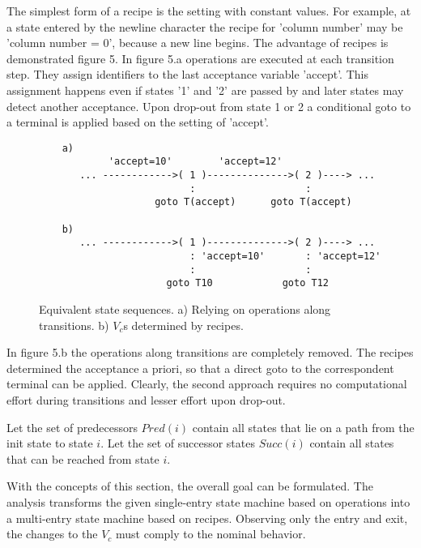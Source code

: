 \documentclass[12pt,a4paper]{scrartcl}
\theoremstyle{break}
\begin{document}
The simplest form of a recipe is the setting with constant values.  For
example, at a state entered by the newline character the recipe for 'column
number' may be 'column number = 0', because a new line begins. The advantage of
recipes is demonstrated figure 5.  In figure 5.a operations are executed at
each transition step. They assign identifiers to the last acceptance variable
'accept'. This assignment happens even if states '1' and '2' are passed by and
later states may detect another acceptance. Upon drop-out from state 1 or 2 a
conditional goto to a terminal is applied based on the setting of 'accept'. 

\begin{figure}[htbp] \leavevmode
\begin{verbatim}
    a)        
            'accept=10'        'accept=12'        
       ... ------------>( 1 )-------------->( 2 )----> ...
                          :                   :
                    goto T(accept)      goto T(accept)

    b) 
       ... ------------>( 1 )-------------->( 2 )----> ...
                          : 'accept=10'       : 'accept=12'              
                          :                   :
                      goto T10            goto T12

\end{verbatim}
\caption{Equivalent state sequences. a) Relying on operations along
transitions. b) $V_c$s determined by recipes.}
\end{figure}


In figure 5.b the operations along transitions are completely removed. The
recipes determined the acceptance a priori, so that a direct goto to the
correspondent terminal can be applied.  Clearly, the second approach requires
no computational effort during transitions and lesser effort upon drop-out.

Let the set of predecessors $Pred(i)$ contain all states that lie on a path
from the init state to state $i$. Let the set of successor states $Succ(i)$
contain all states that can be reached from state $i$.

With the concepts of this section, the overall goal can be formulated. The
analysis transforms the given single-entry state machine based on operations
into a multi-entry state machine based on recipes. Observing only the entry and
exit, the changes to the $V_c$ must comply to the nominal behavior. 

%
\end{document}
